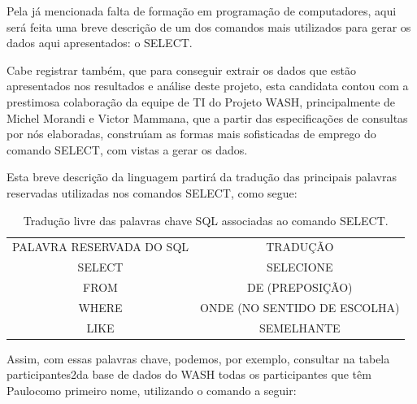 \documentclass[
12pt,		%
openright,	%
twoside,  %
a4paper,			%
chapter=TITLE,		%
english,			%
french,				%
spanish,			%
brazil				%
]{USPSC-classe/USPSC_RedarTex}
\begin{document}
Pela j\'a mencionada falta de forma\c{c}\~ao em programa\c{c}\~ao de computadores, aqui ser\'a feita uma breve descri\c{c}\~ao de um dos comandos mais utilizados para gerar os dados aqui apresentados: o SELECT.










Cabe registrar tamb\'em, que para conseguir extrair os dados que est\~ao apresentados nos resultados e an\'alise deste projeto, esta candidata contou com a prestimosa colabora\c{c}\~ao da equipe de TI do Projeto WASH, principalmente de Michel Morandi e Victor Mammana, que a partir das especifica\c{c}\~oes de consultas por n\'os elaboradas, constru\'{\i}am as formas mais sofisticadas de emprego do comando SELECT, com vistas a gerar os dados.










Esta breve descri\c{c}\~ao da linguagem partir\'a da tradu\c{c}\~ao das principais palavras reservadas utilizadas nos comandos SELECT, como segue:














\begin{table}[htb]
\tiny
\caption{\label{a24598364292e265d8aa79700dafa014c1fe787f}Tradu\c{c}\~ao livre das palavras chave SQL associadas ao comando SELECT.}

\centering
\begin{tabular}{|c|c|}
\hline
PALAVRA RESERVADA DO SQL  &  TRADU\c{C}\~AO \\
SELECT  &  SELECIONE \\
FROM  &  DE (PREPOSI\c{C}\~AO) \\
WHERE  &  ONDE (NO SENTIDO DE ESCOLHA) \\
LIKE  &  SEMELHANTE \\
\hline
\end{tabular}
\end{table}


Assim, com essas palavras chave, podemos, por exemplo, consultar na tabela \textquotedbl participantes2\textquotedbl  da base de dados do WASH todas os participantes que t\^em \textquotedbl Paulo\textquotedbl  como primeiro nome, utilizando o comando a seguir:
\end{document}
